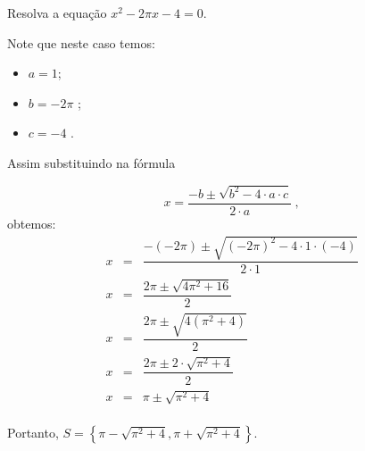  \begin{exem}
  Resolva a equação $x^2 - 2 \pi x - 4= 0$.

 Note que neste caso temos:
  \begin{itemize}
  \item $a= 1$;
  \item $b= -2 \pi $ ;
  \item $c= -4$ .
  \end{itemize}
  Assim substituindo na fórmula

\begin{equation}
x = \dfrac{-b \pm \sqrt{b^2 - 4 \cdot a \cdot c}}{2 \cdot a} \ ,
\end{equation}
 obtemos:
 \begin{eqnarray*}
 x &=& \dfrac{-(-2\pi) \pm \sqrt{(-2\pi)^2 - 4 \cdot 1 \cdot (-4)}}{2 \cdot 1} \\
 x &=& \dfrac{ 2 \pi \pm \sqrt{ 4 \pi^2 + 16}}{2} \\
 x &=& \dfrac{ 2 \pi \pm \sqrt{ 4 (\pi^2 + 4)}}{2} \\
 x &=& \dfrac{ 2 \pi \pm 2 \cdot \sqrt{ \pi^2 + 4}}{2} \\
 x &=& \pi \pm \sqrt{\pi^2 + 4} \\
 \end{eqnarray*}

 Portanto, $S= \left\{ \pi - \sqrt{\pi^2 + 4}, \pi + \sqrt{\pi^2 + 4} \right\}$.
 \end{exem}
 
